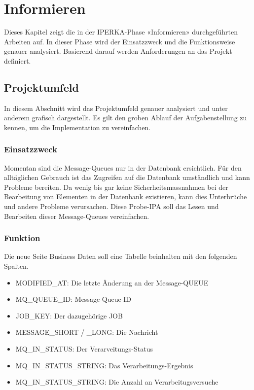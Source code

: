 \chapter{Informieren}\label{ch:informieren}
Dieses Kapitel zeigt die in der IPERKA-Phase «Informieren» durchgeführten Arbeiten auf. In dieser Phase wird der Einsatzzweck und die Funktionsweise genauer analysiert. Basierend darauf werden Anforderungen an das Projekt definiert.

\section{Projektumfeld}
In diesem Abschnitt wird das Projektumfeld genauer analysiert und unter anderem grafisch dargestellt. Es gilt den groben Ablauf der Aufgabenstellung zu kennen, um die Implementation zu vereinfachen.

\subsection{Einsatzzweck}
Momentan sind die Message-Queues nur in der Datenbank ersichtlich. Für den alltäglichen Gebrauch ist das Zugreifen auf die Datenbank umständlich und kann Probleme bereiten. Da wenig bis gar keine Sicherheitsmassnahmen bei der Bearbeitung von Elementen in der Datenbank existieren, kann dies Unterbrüche und andere Probleme verursachen. Diese Probe-IPA soll das Lesen und Bearbeiten dieser Message-Queues vereinfachen.

\subsection{Funktion}
Die neue Seite Business Daten soll eine Tabelle beinhalten mit den folgenden Spalten.
\begin{itemize}
	\item MODIFIED\_AT: Die letzte Änderung an der Message-QUEUE
	\item MQ\_QUEUE\_ID: Message-Queue-ID
	\item JOB\_KEY: Der dazugehörige JOB
	\item MESSAGE\_SHORT / \_LONG: Die Nachricht
	\item MQ\_IN\_STATUS: Der Verarveitungs-Status
	\item MQ\_IN\_STATUS\_STRING: Das Verarbeitungs-Ergebnis
	\item MQ\_IN\_STATUS\_STRING: Die Anzahl an Verarbeitugsversuche
\end{itemize}


